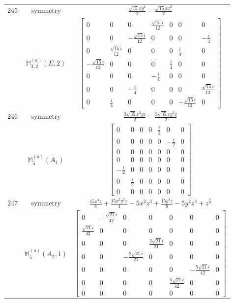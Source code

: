 \documentclass[fleqn,8pt,landscape]{jsarticle}
\begin{document}
\begin{longtable}{ccc}
$ 245 $ & $ \text{symmetry} $ & $ \frac{\sqrt{15} x y^{2}}{2} - \frac{\sqrt{15} x z^{2}}{2} $ \\
$  $ & $ \mathbb{M}_{3,2}^{(a)}(E,2) $ & $ \begin{bmatrix} 0 & 0 & 0 & \frac{\sqrt{15} i}{12} & 0 & 0 & 0 \\ 0 & 0 & - \frac{\sqrt{15} i}{12} & 0 & 0 & 0 & - \frac{i}{4} \\ 0 & \frac{\sqrt{15} i}{12} & 0 & 0 & 0 & \frac{i}{4} & 0 \\ - \frac{\sqrt{15} i}{12} & 0 & 0 & 0 & \frac{i}{4} & 0 & 0 \\ 0 & 0 & 0 & - \frac{i}{4} & 0 & 0 & 0 \\ 0 & 0 & - \frac{i}{4} & 0 & 0 & 0 & \frac{\sqrt{15} i}{12} \\ 0 & \frac{i}{4} & 0 & 0 & 0 & - \frac{\sqrt{15} i}{12} & 0 \end{bmatrix} $ \\ \hline
$ 246 $ & $ \text{symmetry} $ & $ \frac{3 \sqrt{35} x^{3} y z}{2} - \frac{3 \sqrt{35} x y^{3} z}{2} $ \\
$  $ & $ \mathbb{M}_{5}^{(a)}(A_{1}) $ & $ \begin{bmatrix} 0 & 0 & 0 & 0 & \frac{i}{2} & 0 & 0 \\ 0 & 0 & 0 & 0 & 0 & - \frac{i}{2} & 0 \\ 0 & 0 & 0 & 0 & 0 & 0 & 0 \\ 0 & 0 & 0 & 0 & 0 & 0 & 0 \\ - \frac{i}{2} & 0 & 0 & 0 & 0 & 0 & 0 \\ 0 & \frac{i}{2} & 0 & 0 & 0 & 0 & 0 \\ 0 & 0 & 0 & 0 & 0 & 0 & 0 \end{bmatrix} $ \\ \hline
$ 247 $ & $ \text{symmetry} $ & $ \frac{15 x^{4} z}{8} + \frac{15 x^{2} y^{2} z}{4} - 5 x^{2} z^{3} + \frac{15 y^{4} z}{8} - 5 y^{2} z^{3} + z^{5} $ \\
$  $ & $ \mathbb{M}_{5}^{(a)}(A_{2},1) $ & $ \begin{bmatrix} 0 & - \frac{\sqrt{21} i}{42} & 0 & 0 & 0 & 0 & 0 \\ \frac{\sqrt{21} i}{42} & 0 & 0 & 0 & 0 & 0 & 0 \\ 0 & 0 & 0 & \frac{2 \sqrt{21} i}{21} & 0 & 0 & 0 \\ 0 & 0 & - \frac{2 \sqrt{21} i}{21} & 0 & 0 & 0 & 0 \\ 0 & 0 & 0 & 0 & 0 & - \frac{5 \sqrt{21} i}{42} & 0 \\ 0 & 0 & 0 & 0 & \frac{5 \sqrt{21} i}{42} & 0 & 0 \\ 0 & 0 & 0 & 0 & 0 & 0 & 0 \end{bmatrix} $ \\ \hline

\end{longtable}
\end{document}
